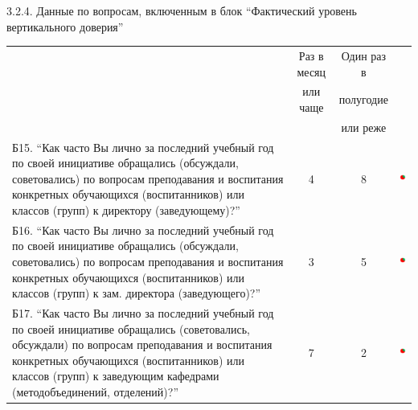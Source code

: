\begin{frame}{3.2.4. Данные по вопросам, включенным в блок ``Фактический уровень вертикального доверия'' }

\tiny

\begin{tabular}{lccl}

 & Раз в месяц  & Один раз в  &\\
 & или чаще    & полугодие  &\\
 &      &  или реже &\\

\begin{minipage}{0.5\textwidth}
Б15.  ``Как часто Вы лично за последний учебный год по своей инициативе обращались (обсуждали, советовались) по вопросам преподавания и воспитания конкретных обучающихся (воспитанников) или классов (групп) к директору (заведующему)?''
\end{minipage}
& 4 & 8 &
\begin{minipage}{1.55cm}
\includegraphics[width=1.5cm, height=1.5cm]{diag.png}
\end{minipage}
\\[0.7cm]

\begin{minipage}{0.5\textwidth}
Б16. ``Как часто Вы лично за последний учебный год по своей инициативе обращались (обсуждали, советовались) по вопросам преподавания и воспитания конкретных обучающихся (воспитанников) или классов (групп) к зам. директора (заведующего)?''
\end{minipage}
& 3 & 5 & 
\begin{minipage}{1.55cm}
\includegraphics[width=1.5cm, height=1.5cm]{diag.png}
\end{minipage}
\\[0.7cm]

\begin{minipage}{0.5\textwidth}
Б17. ``Как часто Вы лично за последний учебный год по своей инициативе обращались (советовались, обсуждали) по вопросам преподавания и воспитания конкретных обучающихся (воспитанников) или классов (групп)  к заведующим кафедрами  (методобъединений, отделений)?''
\end{minipage}
& 7 & 2 &
\begin{minipage}{1.55cm}
\includegraphics[width=1.5cm, height=1.5cm]{diag.png}
\end{minipage}
\\

\end{tabular}


\end{frame}


